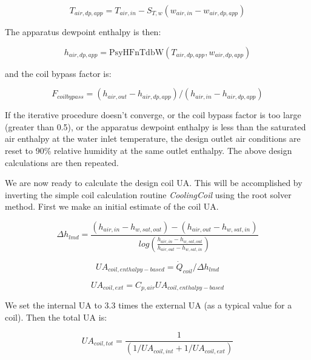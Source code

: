 \begin{equation}
{T_{air,dp,app}} = {T_{air,in}} - {S_{T,w}}({w_{air,in}} - {w_{air,dp,app}})
\end{equation}

The apparatus dewpoint enthalpy is then:

\begin{equation}
{h_{air,dp,app}} = {\mathrm{PsyHFnTdbW}}({T_{air,dp,app}},{w_{air,dp,app}})
\end{equation}

and the coil bypass factor is:

\begin{equation}
{F_{coilbypass}} = ({h_{air,out}} - {h_{air,dp,app}})/({h_{air,in}} - {h_{air,dp,app}})
\end{equation}

If the iterative procedure doesn't converge, or the coil bypass factor is too large (greater than 0.5), or the apparatus dewpoint enthalpy is less than the saturated air enthalpy at the water inlet temperature, the design outlet air conditions are reset to 90\% relative humidity at the same outlet enthalpy. The above design calculations are then repeated.

We are now ready to calculate the design coil UA. This will be accomplished by inverting the simple coil calculation routine \emph{CoolingCoil} using the root solver method. First we make an initial estimate of the coil UA.

\begin{equation}
    \Delta {h_{lmd}} = \frac{({h_{air,in}} - {h_{w,sat,out}}) - ({h_{air,out}} - {h_{w,sat,in}})}{log(\frac{{h_{air,in}} - {h_{w,sat,out}}}{{h_{air,out}} - {h_{w,sat,in}}})}
\end{equation}

\begin{equation}
U{A_{coil,enthalpy - based}} = {\dot Q_{coil}}/\Delta {h_{lmd}}
\end{equation}

\begin{equation}
U{A_{coil,ext}} = {C_{p,air}}U{A_{coil,enthalpy - based}}
\end{equation}

We set the internal UA to 3.3 times the external UA (as a typical value for a coil). Then the total UA is:

\begin{equation}
  UA_{coil,tot} = \frac{1}{{(1/U{A_{coil,int}} + 1/U{A_{coil,ext}})}}
\end{equation}


